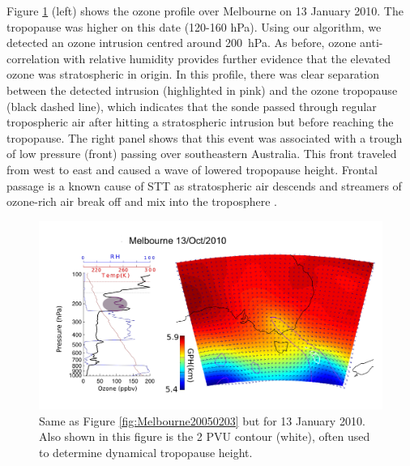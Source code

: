 \documentclass{article}
\begin{document}
    Figure \ref{fig:Melbourne20100113} (left) shows the ozone profile over Melbourne on 13 January 2010.
    The tropopause was higher on this date (120-160 hPa).
    Using our algorithm, we detected an ozone intrusion centred around 200~hPa.
    As before, ozone anti-correlation with relative humidity provides further evidence that the elevated ozone was stratospheric in origin.
    In this profile, there was clear separation between the detected intrusion (highlighted in pink) and the ozone tropopause (black dashed line), which indicates that the sonde passed through regular tropospheric air after hitting a stratospheric intrusion but before reaching the tropopause.
   The right panel shows that this event was associated with a trough of low pressure (front) passing over southeastern Australia.
    This front traveled from west to east and caused a wave of lowered tropopause height. 
    Frontal passage is a known cause of STT as stratospheric air descends and streamers of ozone-rich air break off and mix into the troposphere \citep{Sprenger2003}.
    
    \begin{figure}[!htbp]
      \begin{center}
      \includegraphics[width=1.0\columnwidth]{figures/Melbourne20100113.png}
      \caption{Same as Figure \ref{fig:Melbourne20050203} but for 13 January 2010.
	Also shown in this figure is the 2 PVU contour (white), often used to determine dynamical tropopause height.}
      \label{fig:Melbourne20100113}
      \end{center}
    \end{figure}
\end{document}
